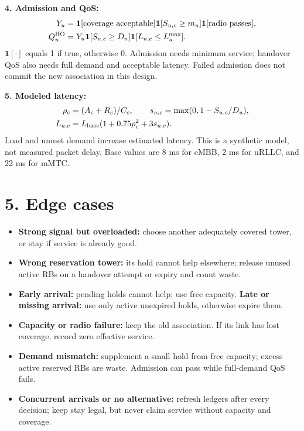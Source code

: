 \documentclass[10pt,a4paper]{article}
\newcommand{\ind}{\mathbf 1}
\begin{document}
\textbf{4. Admission and QoS:}
\begin{align}
Y_u&=\ind[\text{coverage acceptable}]\ind[S_{u,c}\ge m_u]\ind[\text{radio passes}],\\
Q_u^{\rm HO}&=Y_u\ind[S_{u,c}\ge D_u]\ind[L_{u,c}\le L_u^{\max}].
\end{align}
$\ind[\cdot]$ equals 1 if true, otherwise 0. Admission needs minimum service; handover QoS also needs full demand and acceptable latency. Failed admission does not commit the new association in this design.

\textbf{5. Modeled latency:}
\begin{align}
\rho_c&=(A_c+R_c)/C_c,\qquad s_{u,c}=\max(0,1-S_{u,c}/D_u),\\
L_{u,c}&=L_{\rm base}(1+0.75\rho_c^2+3s_{u,c}).
\end{align}
Load and unmet demand increase estimated latency. This is a synthetic model, not measured packet delay. Base values are 8 ms for eMBB, 2 ms for uRLLC, and 22 ms for mMTC.

\section*{5. Edge cases}
\begin{itemize}
\item \textbf{Strong signal but overloaded:} choose another adequately covered tower, or stay if service is already good.
\item \textbf{Wrong reservation tower:} its hold cannot help elsewhere; release unused active RBs on a handover attempt or expiry and count waste.
\item \textbf{Early arrival:} pending holds cannot help; use free capacity. \textbf{Late or missing arrival:} use only active unexpired holds, otherwise expire them.
\item \textbf{Capacity or radio failure:} keep the old association. If its link has lost coverage, record zero effective service.
\item \textbf{Demand mismatch:} supplement a small hold from free capacity; excess active reserved RBs are waste. Admission can pass while full-demand QoS fails.
\item \textbf{Concurrent arrivals or no alternative:} refresh ledgers after every decision; keep stay legal, but never claim service without capacity and coverage.
\end{itemize}

\newpage
\end{document}

